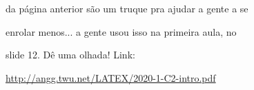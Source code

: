 \documentclass[oneside,12pt]{article}
\begin{document}
da página anterior são um truque pra ajudar a gente a se

enrolar menos... a gente usou isso na primeira aula, no

slide 12. Dê uma olhada! Link:

\ssk

\url{http://angg.twu.net/LATEX/2020-1-C2-intro.pdf}










% 
% 
% 
% 
% 
% 
% 



\end{document}
